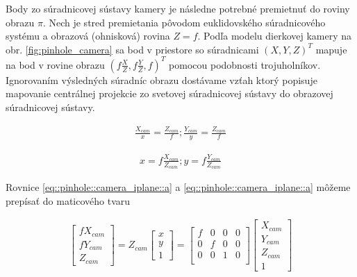 Body zo súradnicovej sústavy kamery je následne potrebné premietnuť do roviny obrazu $\pi$. Nech je stred premietania pôvodom euklidovského súradnicového systému a obrazová (ohnisková) rovina $Z=f$. Podľa modelu dierkovej kamery na obr. \ref{fig:pinhole_camera} sa bod v priestore so súradnicami $\left(X,Y,Z\right)^T$ mapuje na bod v rovine obrazu $\left(f\frac{X}{Z}, f\frac{Y}{Z}, f \right)^T$ pomocou podobnosti trojuholníkov. Ignorovaním výsledných súradníc obrazu dostávame vzťah ktorý popisuje mapovanie centrálnej projekcie zo svetovej súradnicovej sústavy do obrazovej súradnicovej sústavy.

\begin{equation}
\label{eq::pinhole::camera_iplane::a}
\begin{aligned}
\frac{X_{cam}}{x}=\frac{Z_{cam}}{f}; \frac{Y_{cam}}{y}=\frac{Z_{cam}}{f}
\end{aligned}
\end{equation}

\begin{equation}
\label{eq::pinhole::camera_iplane::b}
\begin{aligned}
x=f\frac{X_{cam}}{Z_{cam}}; y=f\frac{Y_{cam}}{Z_{cam}}
\end{aligned}
\end{equation}

Rovnice \ref{eq::pinhole::camera_iplane::a} a \ref{eq::pinhole::camera_iplane::a} môžeme prepísať do maticového tvaru

\begin{equation}
\label{eq::pinhole::camera_iplane}
\begin{aligned}
\begin{bmatrix}
fX_{cam} \\ fY_{cam} \\ Z_{cam}
\end{bmatrix}
= Z_{cam}
\begin{bmatrix}
x \\ y \\ 1
\end{bmatrix}
=
\begin{bmatrix}
f & 0 & 0 & 0 \\
0 & f & 0 & 0 \\
0 & 0 & 1 & 0 \\
\end{bmatrix}
\begin{bmatrix}
X_{cam} \\ Y_{cam} \\ Z_{cam} \\ 1 
\end{bmatrix}
\end{aligned}
\end{equation}

